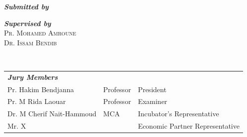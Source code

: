 \begin{titlepage}
\begin{center}
		\begin{minipage}{0.46\textwidth}
			\begin{flushleft}
				\emph{\textbf{Submitted by}}\\
				\textsc{\@author}
			\end{flushleft}
		\end{minipage}
		\begin{minipage}{0.46\textwidth}
			\begin{flushright}
				\emph{\textbf{Supervised by}}\\
				\textsc{Pr. Mohamed Amroune}\\
				\textsc{Dr. Issam Bendib}
			\end{flushright}
		\end{minipage}\\[1cm]
		\begin{tabular}{lll}
			\emph{\textbf{Jury Members}} &  &  \\
			Pr. Hakim Bendjanna & Professor & President \\
			Pr. M Rida Laouar & Professor & Examiner \\
			Dr. M Cherif Nait-Hammoud & MCA & Incubator's Representative \\
			Mr. X &  & Economic Partner Representative \\
		\end{tabular}
		\vfill
		\@date
	\end{center}
\end{titlepage}
